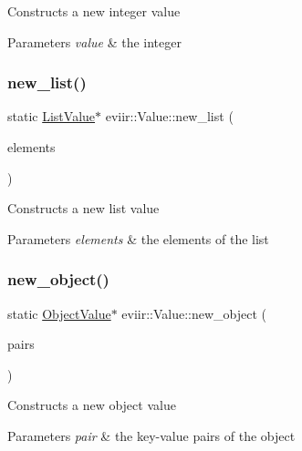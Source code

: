 Constructs a new integer value 
\begin{DoxyParams}{Parameters}
{\em value} & the integer \\
\hline
\end{DoxyParams}
\mbox{\label{classeviir_1_1Value_a285f3fcf2b610578bbf8c9d02460cb3f}} 
\subsubsection{\texorpdfstring{new\+\_\+list()}{new\_list()}}
{\footnotesize\ttfamily static \hyperlink{classeviir_1_1ListValue}{List\+Value}$\ast$ eviir\+::\+Value\+::new\+\_\+list (\begin{DoxyParamCaption}\item[{vector$<$ \hyperlink{classeviir_1_1Value}{Value} $\ast$$>$}]{elements }\end{DoxyParamCaption})\hspace{0.3cm}{\ttfamily [static]}}

Constructs a new list value 
\begin{DoxyParams}{Parameters}
{\em elements} & the elements of the list \\
\hline
\end{DoxyParams}
\mbox{\label{classeviir_1_1Value_a876b8c35f35e3fe2c28fcac56a69ee3d}} 
\subsubsection{\texorpdfstring{new\+\_\+object()}{new\_object()}}
{\footnotesize\ttfamily static \hyperlink{classeviir_1_1ObjectValue}{Object\+Value}$\ast$ eviir\+::\+Value\+::new\+\_\+object (\begin{DoxyParamCaption}\item[{map$<$ \hyperlink{classeviir_1_1Value}{Value} $\ast$C\+O\+M\+MA \hyperlink{classeviir_1_1Value}{Value} $\ast$$>$}]{pairs }\end{DoxyParamCaption})\hspace{0.3cm}{\ttfamily [static]}}

Constructs a new object value 
\begin{DoxyParams}{Parameters}
{\em pair} & the key-\/value pairs of the object \\
\hline
\end{DoxyParams}
\mbox{\label{classeviir_1_1Value_ab52c6c549453d60104515e2f8e68967a}} 

